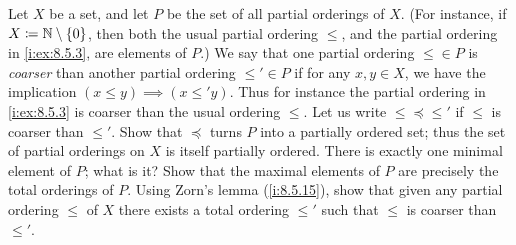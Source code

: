 \begin{ex}\label{i:ex:8.5.16}
  Let \(X\) be a set, and let \(P\) be the set of all partial orderings of \(X\).
  (For instance, if \(X \coloneqq \mathbb{N} \setminus \left\lbrace0\right\rbrace\), then both the usual partial ordering \(\leq\), and the partial ordering in \cref{i:ex:8.5.3}, are elements of \(P\).)
  We say that one partial ordering \(\leq \in P\) is \emph{coarser} than another partial ordering \(\leq' \in P\) if for any \(x, y \in X\), we have the implication \((x \leq y) \implies (x \leq' y)\).
  Thus for instance the partial ordering in \cref{i:ex:8.5.3} is coarser than the usual ordering \(\leq\).
  Let us write \(\leq \preceq \leq'\) if \(\leq\) is coarser than \(\leq'\).
  Show that \(\preceq\) turns \(P\) into a partially ordered set;
  thus the set of partial orderings on \(X\) is itself partially ordered.
  There is exactly one minimal element of \(P\);
  what is it?
  Show that the maximal elements of \(P\) are precisely the total orderings of \(P\).
  Using Zorn's lemma (\cref{i:8.5.15}), show that given any partial ordering \(\leq\) of \(X\) there exists a total ordering \(\leq'\) such that \(\leq\) is coarser than \(\leq'\).
\end{ex}

